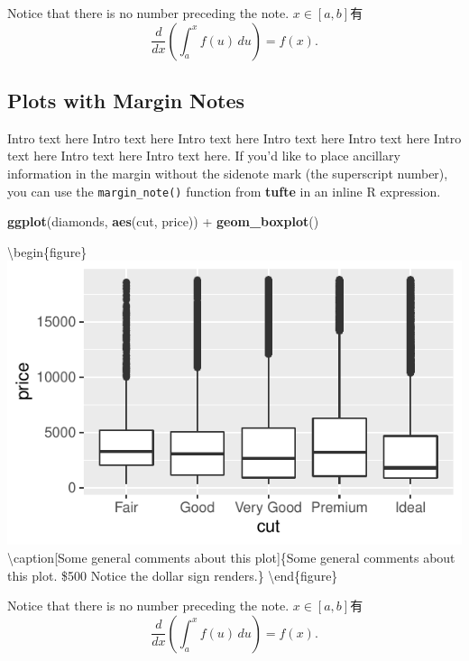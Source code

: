 \documentclass[]{tufte-handout}
\newenvironment{Shaded}{}{}
\newcommand{\KeywordTok}[1]{\textcolor[rgb]{0.00,0.44,0.13}{\textbf{#1}}}
\newcommand{\NormalTok}[1]{#1}
\newcommand{\OperatorTok}[1]{\textcolor[rgb]{0.40,0.40,0.40}{#1}}
\newcommand{\StringTok}[1]{\textcolor[rgb]{0.25,0.44,0.63}{#1}}
\begin{document}
\begin{marginfigure}
Notice that there is no number preceding the note. \(x \in [a, b]\)有
\[\frac{d}{dx}\left( \int_{a}^{x} f(u)\,du\right)=f(x).\]
\end{marginfigure}

\hypertarget{plots-with-margin-notes}{%
\subsection{Plots with Margin Notes}\label{plots-with-margin-notes}}

Intro text here Intro text here Intro text here Intro text here Intro
text here Intro text here Intro text here Intro text here. If you'd like
to place ancillary information in the margin without the sidenote mark
(the superscript number), you can use the \texttt{margin\_note()}
function from \textbf{tufte} in an inline R expression.

\begin{Shaded}
\begin{Highlighting}[]
\KeywordTok{ggplot}\NormalTok{(diamonds, }\KeywordTok{aes}\NormalTok{(cut, price)) }\OperatorTok{+}\StringTok{ }\KeywordTok{geom_boxplot}\NormalTok{()}
\end{Highlighting}
\end{Shaded}

\textbackslash begin\{figure\}
\includegraphics{CPPXHBSN-Comparison_files/figure-latex/fig-main-1}
\textbackslash caption{[}Some general comments about this plot{]}\{Some
general comments about this plot. \$500 Notice the dollar sign
renders.\}\label{fig:fig-main} \textbackslash end\{figure\}

\begin{marginfigure}
Notice that there is no number preceding the note. \(x \in [a, b]\)有
\[\frac{d}{dx}\left( \int_{a}^{x} f(u)\,du\right)=f(x).\]
\end{marginfigure}
\end{document}
